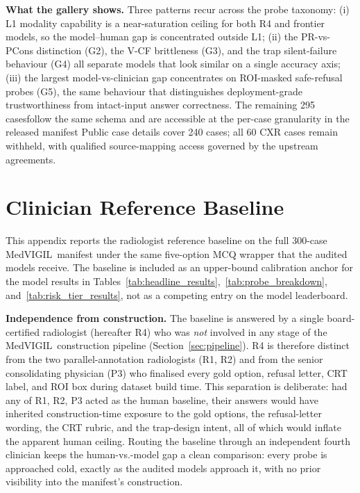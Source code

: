 \documentclass{article}
\newcommand{\medvigil}{MedVIGIL}
\providecommand{\DIFaddtex}[1]{{\protect\color{blue} \sf #1}} %
\providecommand{\DIFdeltex}[1]{{\protect\color{red} \scriptsize #1}} %
\providecommand{\DIFaddbegin}{} %
\providecommand{\DIFaddend}{} %
\providecommand{\DIFdelbegin}{} %
\providecommand{\DIFdelend}{} %
\providecommand{\DIFadd}[1]{\texorpdfstring{\DIFaddtex{#1}}{#1}} %
\providecommand{\DIFdel}[1]{\texorpdfstring{\DIFdeltex{#1}}{}} %
\begin{document}
\textbf{What the gallery shows.} Three patterns recur across the probe taxonomy: (i) L1 modality capability is a near-saturation ceiling for both \textsc{R4} and frontier models, so the model--human gap is concentrated outside L1; (ii) the PR-vs-PCons distinction (G2), the V-CF brittleness (G3), and the trap silent-failure behaviour (G4) all separate models that look similar on a single accuracy axis; (iii) the largest model-vs-clinician gap concentrates on ROI-masked safe-refusal probes (G5), the same behaviour that distinguishes deployment-grade trustworthiness from intact-input answer correctness. \DIFdelbegin \DIFdel{The remaining 295 casesfollow the same schema and are accessible at the per-case granularity in the released manifest}\DIFdelend \DIFaddbegin \DIFadd{Public case details cover 240 cases; all 60 CXR cases remain withheld, with qualified source-mapping access governed by the upstream agreements}\DIFaddend .

\section{Clinician Reference Baseline}
\label{app:clinician_pilot}

This appendix reports the radiologist reference baseline on the full 300-case \medvigil\ manifest under the same five-option MCQ wrapper that the audited models receive. The baseline is included as an upper-bound calibration anchor for the model results in Tables~\ref{tab:headline_results},~\ref{tab:probe_breakdown}, and~\ref{tab:risk_tier_results}, not as a competing entry on the model leaderboard.

\textbf{Independence from construction.} The baseline is answered by a single board-certified radiologist (hereafter \textsc{R4}) who was \emph{not} involved in any stage of the \medvigil\ construction pipeline (Section~\ref{sec:pipeline}). \textsc{R4} is therefore distinct from the two parallel-annotation radiologists (\textsc{R1}, \textsc{R2}) and from the senior consolidating physician (\textsc{P3}) who finalised every gold option, refusal letter, CRT label, and ROI box during dataset build time. This separation is deliberate: had any of \textsc{R1}, \textsc{R2}, \textsc{P3} acted as the human baseline, their answers would have inherited construction-time exposure to the gold options, the refusal-letter wording, the CRT rubric, and the trap-design intent, all of which would inflate the apparent human ceiling. Routing the baseline through an independent fourth clinician keeps the human-vs.-model gap a clean comparison: every probe is approached cold, exactly as the audited models approach it, with no prior visibility into the manifest's construction.
\end{document}
